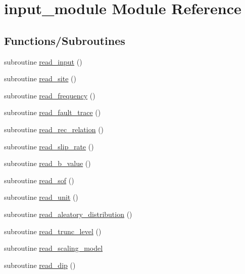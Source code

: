 \hypertarget{namespaceinput__module}{}\section{input\+\_\+module Module Reference}
\label{namespaceinput__module}
\subsection*{Functions/\+Subroutines}
\begin{DoxyCompactItemize}
\item 
subroutine \hyperlink{namespaceinput__module_a00c4a5d066f42d27b85b05a38bed5160}{read\+\_\+input} ()
\item 
subroutine \hyperlink{namespaceinput__module_a07cd15a61e7f02633605f2f442ceb937}{read\+\_\+site} ()
\item 
subroutine \hyperlink{namespaceinput__module_afa2966a0e5fac1ac508ed7aed4f0a3d8}{read\+\_\+frequency} ()
\item 
subroutine \hyperlink{namespaceinput__module_a0d373b7166a3c84647da12172e1ea635}{read\+\_\+fault\+\_\+trace} ()
\item 
subroutine \hyperlink{namespaceinput__module_a1e706b509f806cf51ec52d88f6be16f5}{read\+\_\+rec\+\_\+relation} ()
\item 
subroutine \hyperlink{namespaceinput__module_a162c082b34aa3c082906be0b3260e07b}{read\+\_\+slip\+\_\+rate} ()
\item 
subroutine \hyperlink{namespaceinput__module_aeafdecc4d19831cf533fb2dcaf0a0844}{read\+\_\+b\+\_\+value} ()
\item 
subroutine \hyperlink{namespaceinput__module_acc844c5a0060bf20c9ae19ac3d2e3740}{read\+\_\+sof} ()
\item 
subroutine \hyperlink{namespaceinput__module_af0a24a3c1c27d7891b4ca97e8cbf73e8}{read\+\_\+unit} ()
\item 
subroutine \hyperlink{namespaceinput__module_a05356d7be39772919ba250f4ea4da2f3}{read\+\_\+aleatory\+\_\+distribution} ()
\item 
subroutine \hyperlink{namespaceinput__module_a57f855a995185ff6d52c0a402a4a536b}{read\+\_\+trunc\+\_\+level} ()
\item 
subroutine \hyperlink{namespaceinput__module_a0c45a351fde1aa9a3fe8f15c1d78330e}{read\+\_\+scaling\+\_\+model}
\item 
subroutine \hyperlink{namespaceinput__module_ac982cae54a9baa5626ed817f28c75595}{read\+\_\+dip} ()
\item 

\end{DoxyCompactItemize}
